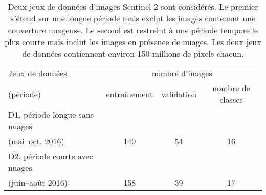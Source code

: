 \begin{table}[h]
\caption[Descriptifs des deux jeux de données d'images Sentinel-2 considérés.]{Deux jeux de données d'images Sentinel-2 sont considérés. Le premier s'étend sur une longue période mais exclut les images contenant une couverture nuageuse. Le second est restreint à une période temporelle plus courte mais inclut les images en présence de nuages. Les deux jeux de données contiennent environ 150 millions de pixels chacun.}
\label{tab:datasets}
\begin{tabular}{lccc}
\toprule
Jeux de données & \multicolumn{3}{c}{nombre d'images}\\
(période)  & entraînement & validation  & nombre de classes \\
\midrule
D1, période longue sans nuages & & & \\
 (mai--oct. 2016) & 140 & 54 & 16 \\
\midrule
D2, période courte avec nuages & & & \\
(juin--août 2016) & 158 & 39 & 17 \\
\bottomrule
\end{tabular}
\end{table}

